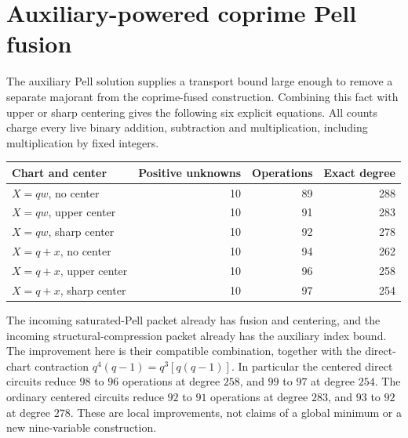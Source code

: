 \section{Auxiliary-powered coprime Pell fusion}
\label{sec:aux-fused}
The auxiliary Pell solution supplies a transport bound large enough to remove a separate majorant from the coprime-fused construction. Combining this fact with upper or sharp centering gives the following six explicit equations. All counts charge every live binary addition, subtraction and multiplication, including multiplication by fixed integers.
\begin{center}
\begin{tabular}{@{}lrrr@{}}
\toprule
Chart and center & Positive unknowns & Operations & Exact degree\\
\midrule
$X=qw$, no center &10&89&288\\
$X=qw$, upper center &10&91&283\\
$X=qw$, sharp center &10&92&278\\
$X=q+x$, no center &10&94&262\\
$X=q+x$, upper center &10&96&258\\
$X=q+x$, sharp center &10&97&254\\
\bottomrule
\end{tabular}
\end{center}
The incoming saturated-Pell packet already has fusion and centering, and the incoming structural-compression packet already has the auxiliary index bound. The improvement here is their compatible combination, together with the direct-chart contraction $q^4(q-1)=q^3[q(q-1)]$. In particular the centered direct circuits reduce $98$ to $96$ operations at degree $258$, and $99$ to $97$ at degree $254$. The ordinary centered circuits reduce $92$ to $91$ operations at degree $283$, and $93$ to $92$ at degree $278$. These are local improvements, not claims of a global minimum or a new nine-variable construction.

